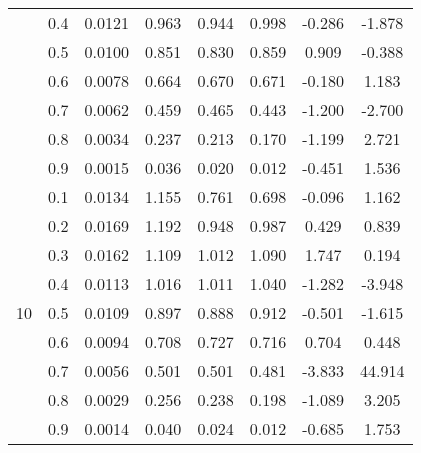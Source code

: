 \documentclass[11pt,a4paper]{report}
\begin{document}
\begin{longtable}{ | c | c || c | c | c | c | c | c | }
 & 0.4 & 0.0121 & 0.963 & 0.944 & 0.998 & -0.286 & -1.878 \\
 & 0.5 & 0.0100 & 0.851 & 0.830 & 0.859 & 0.909 & -0.388 \\
 & 0.6 & 0.0078 & 0.664 & 0.670 & 0.671 & -0.180 & 1.183 \\
 & 0.7 & 0.0062 & 0.459 & 0.465 & 0.443 & -1.200 & -2.700 \\
 & 0.8 & 0.0034 & 0.237 & 0.213 & 0.170 & -1.199 & 2.721 \\
 & 0.9 & 0.0015 & 0.036 & 0.020 & 0.012 & -0.451 & 1.536 \\
 \hline
\multirow{9}{*}{10} & 0.1 & 0.0134 & 1.155 & 0.761 & 0.698 & -0.096 & 1.162 \\
 & 0.2 & 0.0169 & 1.192 & 0.948 & 0.987 & 0.429 & 0.839 \\
 & 0.3 & 0.0162 & 1.109 & 1.012 & 1.090 & 1.747 & 0.194 \\
 & 0.4 & 0.0113 & 1.016 & 1.011 & 1.040 & -1.282 & -3.948 \\
 & 0.5 & 0.0109 & 0.897 & 0.888 & 0.912 & -0.501 & -1.615 \\
 & 0.6 & 0.0094 & 0.708 & 0.727 & 0.716 & 0.704 & 0.448 \\
 & 0.7 & 0.0056 & 0.501 & 0.501 & 0.481 & -3.833 & 44.914 \\
 & 0.8 & 0.0029 & 0.256 & 0.238 & 0.198 & -1.089 & 3.205 \\
 & 0.9 & 0.0014 & 0.040 & 0.024 & 0.012 & -0.685 & 1.753 \\
 \hline
\hline
\end{longtable}
\end{document}
